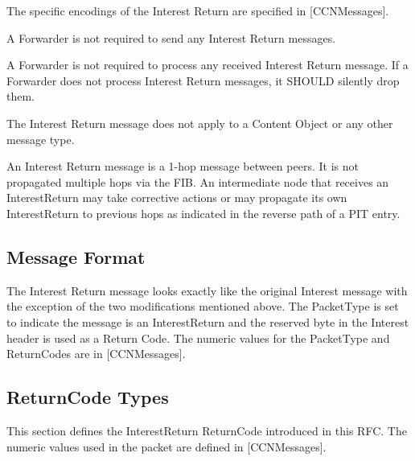 \documentclass[12pt]{article}
\begin{document}
The specific encodings of the Interest Return are specified in
[CCNMessages].

A Forwarder is not required to send any Interest Return messages.

A Forwarder is not required to process any received Interest Return
message.  If a Forwarder does not process Interest Return messages,
it SHOULD silently drop them.

The Interest Return message does not apply to a Content Object or any
other message type.

An Interest Return message is a 1-hop message between peers.  It is
not propagated multiple hops via the FIB.  An intermediate node that
receives an InterestReturn may take corrective actions or may
propagate its own InterestReturn to previous hops as indicated in the
reverse path of a PIT entry.

\subsection{Message Format}
The Interest Return message looks exactly like the original Interest
message with the exception of the two modifications mentioned above.
The PacketType is set to indicate the message is an InterestReturn
and the reserved byte in the Interest header is used as a Return
Code.  The numeric values for the PacketType and ReturnCodes are in
[CCNMessages].

\subsection{ReturnCode Types}
This section defines the InterestReturn ReturnCode introduced in this
RFC.  The numeric values used in the packet are defined in
[CCNMessages].
\end{document}
